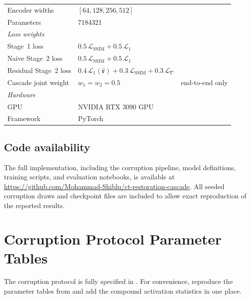 \begin{table}[!htb]
\begin{tabular}{@{}lll@{}}
        Encoder widths  & $[64,128,256,512]$ & \\
        Parameters      & \num{7184321} & \\
        \midrule
        \multicolumn{3}{l}{\textit{Loss weights}} \\
        Stage~1 loss    & $0.5\,\mathcal{L}_\mathrm{SSIM} + 0.5\,\mathcal{L}_1$ & \\
        Naive Stage~2 loss & $0.5\,\mathcal{L}_\mathrm{SSIM} + 0.5\,\mathcal{L}_1$ & \\
        Residual Stage~2 loss & $0.4\,\mathcal{L}_1(\hat{\mathbf{r}}) + 0.3\,\mathcal{L}_\mathrm{SSIM} + 0.3\,\mathcal{L}_\nabla$ & \\
        Cascade joint weight & $w_1=w_2=0.5$ & end-to-end only \\
        \midrule
        \multicolumn{3}{l}{\textit{Hardware}} \\
        GPU             & NVIDIA RTX 3090 GPU & \\
        Framework       & PyTorch & \\
        \bottomrule
    \end{tabular}
\end{table}

\section*{Code availability}

The full implementation, including the corruption pipeline, model definitions, training scripts, and evaluation notebooks, is available at \url{https://github.com/Mohammad-Shiblu/ct-restoration-cascade}. All seeded corruption draws and checkpoint files are included to allow exact reproduction of the reported results.


\chapter{Corruption Protocol Parameter Tables}
\label{app:protocol_params}

The corruption protocol is fully specified in . For convenience,  reproduce the parameter tables from  and add the compound activation statistics in one place.

